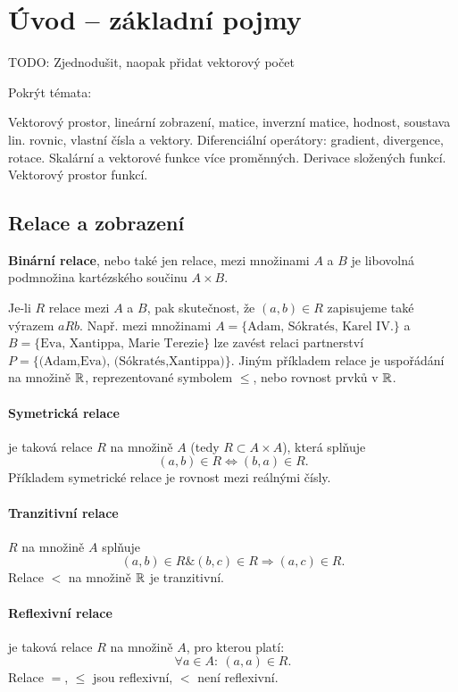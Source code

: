\section{Úvod -- základní pojmy}
TODO: Zjednodušit, naopak přidat vektorový počet

Pokrýt témata:

Vektorový prostor, lineární zobrazení, matice, inverzní matice, hodnost, soustava lin. rovnic, vlastní čísla a vektory. 
Diferenciální operátory: gradient, divergence, rotace. 
Skalární a vektorové funkce více proměnných. 
Derivace složených funkcí. Vektorový prostor funkcí.



\subsection{Relace a zobrazení}

\begin{df} {\bf Binární relace}, nebo také jen relace, mezi množinami $A$ a $B$ je libovolná podmnožina kartézského součinu $A\times B$.
\end{df}
Je-li $R$ relace mezi $A$ a $B$, pak skutečnost, že $(a,b)\in R$ zapisujeme také výrazem $aRb$.
Např. mezi množinami $A=\{\mbox{Adam, Sókratés, Karel IV.}\}$ a $B=\{\mbox{Eva, Xantippa, Marie Terezie}\}$ lze zavést relaci partnerství $P=\{\mbox{(Adam,Eva), (Sókratés,Xantippa)}\}$.
Jiným příkladem relace je uspořádání na množině $\mathbb R$, reprezentované symbolem $\le$, nebo rovnost prvků v $\mathbb R$.

\paragraph{Symetrická relace} je taková relace $R$ na množině $A$ (tedy $R\subset A\times A$), která splňuje
$$ (a,b)\in R\Leftrightarrow(b,a)\in R. $$
Příkladem symetrické relace je rovnost mezi reálnými čísly.

\paragraph{Tranzitivní relace} $R$ na množině $A$ splňuje
$$ (a,b)\in R \& (b,c)\in R\Rightarrow (a,c)\in R. $$
Relace $<$ na množině $\mathbb R$ je tranzitivní.

\paragraph{Reflexivní relace} je taková relace $R$ na množině $A$, pro kterou platí:
$$ \forall a\in A:~(a,a)\in R. $$
Relace $=$, $\le$ jsou reflexivní, $<$ není reflexivní.


